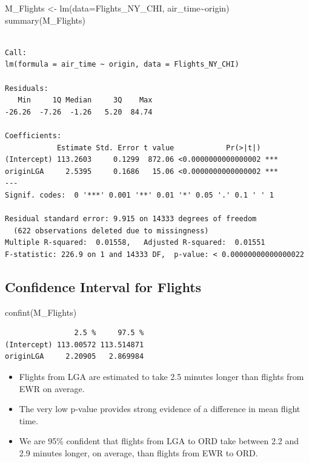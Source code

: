 \documentclass[
  letterpaper,
  DIV=11,
  numbers=noendperiod]{scrreprt}
\newenvironment{Shaded}{\begin{snugshade}}{\end{snugshade}}
\newcommand{\AttributeTok}[1]{\textcolor[rgb]{0.40,0.45,0.13}{#1}}
\newcommand{\FunctionTok}[1]{\textcolor[rgb]{0.28,0.35,0.67}{#1}}
\newcommand{\NormalTok}[1]{\textcolor[rgb]{0.00,0.23,0.31}{#1}}
\newcommand{\OtherTok}[1]{\textcolor[rgb]{0.00,0.23,0.31}{#1}}
\newcommand{\SpecialCharTok}[1]{\textcolor[rgb]{0.37,0.37,0.37}{#1}}
\begin{document}
\begin{Shaded}
\begin{Highlighting}[]
\NormalTok{M\_Flights }\OtherTok{\textless{}{-}} \FunctionTok{lm}\NormalTok{(}\AttributeTok{data=}\NormalTok{Flights\_NY\_CHI, air\_time}\SpecialCharTok{\textasciitilde{}}\NormalTok{origin)}
\FunctionTok{summary}\NormalTok{(M\_Flights)}
\end{Highlighting}
\end{Shaded}

\begin{verbatim}

Call:
lm(formula = air_time ~ origin, data = Flights_NY_CHI)

Residuals:
   Min     1Q Median     3Q    Max 
-26.26  -7.26  -1.26   5.20  84.74 

Coefficients:
            Estimate Std. Error t value            Pr(>|t|)    
(Intercept) 113.2603     0.1299  872.06 <0.0000000000000002 ***
originLGA     2.5395     0.1686   15.06 <0.0000000000000002 ***
---
Signif. codes:  0 '***' 0.001 '**' 0.01 '*' 0.05 '.' 0.1 ' ' 1

Residual standard error: 9.915 on 14333 degrees of freedom
  (622 observations deleted due to missingness)
Multiple R-squared:  0.01558,   Adjusted R-squared:  0.01551 
F-statistic: 226.9 on 1 and 14333 DF,  p-value: < 0.00000000000000022
\end{verbatim}

\subsection{Confidence Interval for
Flights}\label{confidence-interval-for-flights}

\begin{Shaded}
\begin{Highlighting}[]
\FunctionTok{confint}\NormalTok{(M\_Flights)}
\end{Highlighting}
\end{Shaded}

\begin{verbatim}
                2.5 %     97.5 %
(Intercept) 113.00572 113.514871
originLGA     2.20905   2.869984
\end{verbatim}

\begin{itemize}
\item
  Flights from LGA are estimated to take 2.5 minutes longer than flights
  from EWR on average.
\item
  The very low p-value provides strong evidence of a difference in mean
  flight time.
\item
  We are 95\% confident that flights from LGA to ORD take between 2.2
  and 2.9 minutes longer, on average, than flights from EWR to ORD.
\end{itemize}
\end{document}
